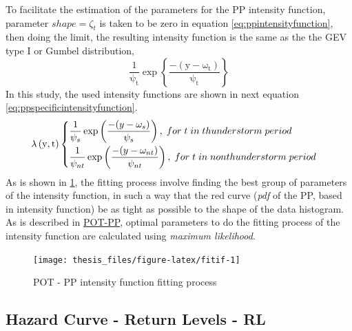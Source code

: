 \documentclass[12pt,oneside]{reedthesis}
\begin{document}
To facilitate the estimation of the parameters for the PP intensity function, parameter \(shape = \zeta_t\) is taken to be zero in equation \eqref{eq:ppintensityfunction}, then doing the limit, the resulting intensity function is the same as the the GEV type I or Gumbel distribution,
\begin{equation}
  \mathrm{
          \frac{1}{\psi_t}\exp\left\{\frac{-(y-\omega_t)}{\psi_t}\right\}
         }
  \label{eq:ppusedif}
\end{equation}
In this study, the used intensity functions are shown in next equation \eqref{eq:ppspecificintensityfunction}.
\begin{equation}
  \mathrm{
    \lambda\left(y,t\right)
    \begin{cases}
      \begin{split}
            &\frac{1}{\psi_s}\exp\left(\frac{-(y-\omega_s)}{\psi_s}\right),\;for\;t\;in\;thunderstorm\;period
            \\
            &\frac{1}{\psi_{nt}}\exp\left(\frac{-(y-\omega_{nt})}{\psi_{nt}}\right),\;for\;t\;in\;non\-thunderstorm\;period      
      \end{split}
    \end{cases}
  }
  \label{eq:ppspecificintensityfunction}
\end{equation}
As is shown in \ref{fig:fitif}, the fitting process involve finding the best group of parameters of the intensity function, in such a way that the red curve (\emph{pdf} of the PP, based in intensity function) be as tight as possible to the shape of the data histogram. As is described in \protect\hyperlink{pot-pp}{POT-PP}, optimal parameters to do the fitting process of the intensity function are calculated using \emph{maximum likelihood}.

\footnotesize
\begin{figure}

{\centering \texttt{[image: thesis\_files/figure-latex/fitif-1]} 

}

\caption{POT - PP intensity function fitting process}\label{fig:fitif}
\end{figure}
\normalsize

\hypertarget{hazard-curve---return-levels---rl}{%
\subsection{Hazard Curve - Return Levels - RL}\label{hazard-curve---return-levels---rl}}
\end{document}
